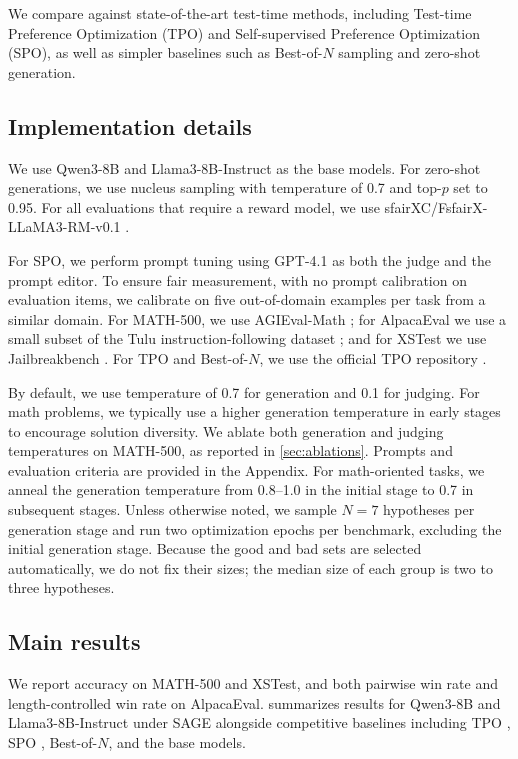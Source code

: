 \documentclass{article}
\theoremstyle{plain}
\theoremstyle{definition}
\theoremstyle{remark}
\newcommand{\method}{SAGE} %
\begin{document}
We compare against state-of-the-art test-time methods, including Test-time Preference Optimization (TPO) and Self-supervised Preference Optimization (SPO), as well as simpler baselines such as Best-of-\(N\) sampling and zero-shot generation.

\subsection{Implementation details}
We use Qwen3-8B and Llama3-8B-Instruct as the base models. For zero-shot generations, we use nucleus sampling with temperature of 0.7 and top-\(p\) set to 0.95.
For all evaluations that require a reward model, we use sfairXC/FsfairX-LLaMA3-RM-v0.1 \citep{dong2024rlhf}.

For SPO, we perform prompt tuning using GPT-4.1 as both the judge and the prompt editor. To ensure fair measurement, with no prompt calibration on evaluation items, we calibrate on five out-of-domain examples per task from a similar domain.
For MATH-500, we use AGIEval-Math \citep{zhongagieval}; for AlpacaEval we use a small subset of the Tulu instruction-following dataset \citet{lambert2024tulu}; and for XSTest we use Jailbreakbench \citet{chao2024jailbreakbench}. For TPO and Best-of-\(N\), we use the official TPO repository \citet{litest}.

By default, we use temperature of 0.7 for generation and 0.1 for judging. For math problems, we typically use a higher generation temperature in early stages to encourage solution diversity. We ablate both generation and judging temperatures on MATH-500, as reported in \cref{sec:ablations}. Prompts and evaluation criteria are provided in the Appendix.
For math-oriented tasks, we anneal the generation temperature from 0.8--1.0 in the initial stage to 0.7 in subsequent stages. Unless otherwise noted, we sample \(N=7\) hypotheses per generation stage and run two optimization epochs per benchmark, excluding the initial generation stage. Because the good and bad sets are selected automatically, we do not fix their sizes; the median size of each group is two to three hypotheses.

\subsection{Main results}
\noindent We report accuracy on MATH-500 and XSTest, and both pairwise win rate and length-controlled win rate on AlpacaEval.  summarizes results for Qwen3-8B and Llama3-8B-Instruct under \method{} alongside competitive baselines including TPO \citep{litest}, SPO \citep{xiang2025self}, Best-of-\(N\), and the base models.
\end{document}
